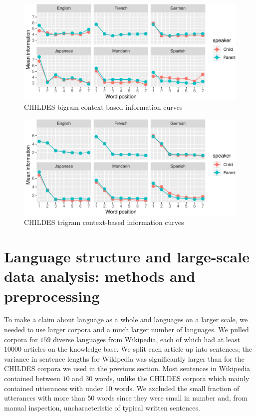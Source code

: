 \documentclass[11pt,]{article}
\begin{document}
\begin{figure}
\centering
\includegraphics{paper_files/figure-latex/unnamed-chunk-2-1.pdf}
\caption{\label{fig:unnamed-chunk-2}CHILDES bigram context-based information curves}
\end{figure}

\begin{figure}
\centering
\includegraphics{paper_files/figure-latex/unnamed-chunk-3-1.pdf}
\caption{\label{fig:unnamed-chunk-3}CHILDES trigram context-based information curves}
\end{figure}

\hypertarget{language-structure-and-large-scale-data-analysis-methods-and-preprocessing}{%
\section{Language structure and large-scale data analysis: methods and preprocessing}\label{language-structure-and-large-scale-data-analysis-methods-and-preprocessing}}

To make a claim about language as a whole and languages on a larger scale, we needed to use larger corpora and a much larger number of languages. We pulled corpora for \(159\) diverse languages from Wikipedia, each of which had at least \(10000\) articles on the knowledge base. We split each article up into sentences; the variance in sentence lengths for Wikipedia was significantly larger than for the CHILDES corpora we used in the previous section. Most sentences in Wikipedia contained between \(10\) and \(30\) words, unlike the CHILDES corpora which mainly contained utterances with under 10 words. We excluded the small fraction of utterances with more than \(50\) words since they were small in number and, from manual inspection, uncharacteristic of typical written sentences.
\end{document}
